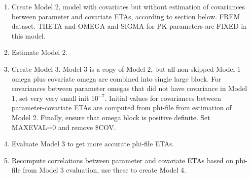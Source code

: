 \begin{enumerate}
\item Create Model 2, model with covariates but without
estimation of covariances between parameter and covariate ETAs,
according to section below. FREM dataset.
THETA and OMEGA and SIGMA for PK parameters are FIXED in this model.
\item Estimate Model 2.
\item Create Model 3.
Model 3 is a copy of Model 2, but all non-skipped Model 1 omega plus covariate omega are combined
into single large block. For covariances between parameter omegas that did
not have covariance in Model 1, set very very small init $10^{-7}$.
Initial values for covariances between parameter-covariate ETAs are computed from
phi-file from estimation of Model 2. Finally, ensure that omega block is positive definite.
Set MAXEVAL=0 and remove \$COV.
\item Evaluate Model 3 to get more accurate phi-file ETAs.
\item Recompute correlations
between parameter and covariate ETAs based on phi-file from Model 3 evaluation,
use these to create Model 4.


\end{enumerate}
